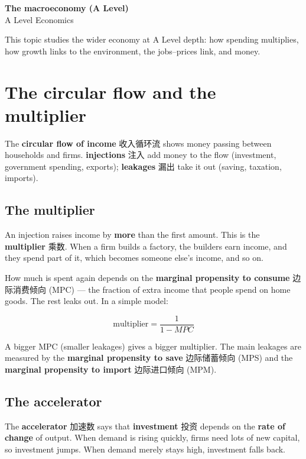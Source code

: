 \documentclass[11pt]{article}
\begin{document}
\begin{center}
  {\LARGE\bfseries The macroeconomy (A Level)}\\[0.35em]
  {\large A Level Economics}
\end{center}
\vspace{0.6em}

This topic studies the wider economy at A Level depth: how spending multiplies, how growth links to the environment, the jobs–prices link, and money.

\section*{The circular flow and the multiplier}

The \textbf{circular flow of income} 收入循环流 shows money passing between households and firms. \textbf{injections} 注入 add money to the flow (investment, government spending, exports); \textbf{leakages} 漏出 take it out (saving, taxation, imports).

\subsection*{The multiplier}

An injection raises income by \textbf{more} than the first amount. This is the \textbf{multiplier} 乘数. When a firm builds a factory, the builders earn income, and they spend part of it, which becomes someone else's income, and so on.

How much is spent again depends on the \textbf{marginal propensity to consume} 边际消费倾向 (MPC) — the fraction of extra income that people spend on home goods. The rest leaks out. In a simple model:

\[
\text{multiplier} = \frac{1}{1 - MPC}
\]

A bigger MPC (smaller leakages) gives a bigger multiplier. The main leakages are measured by the \textbf{marginal propensity to save} 边际储蓄倾向 (MPS) and the \textbf{marginal propensity to import} 边际进口倾向 (MPM).

\subsection*{The accelerator}

The \textbf{accelerator} 加速数 says that \textbf{investment} 投资 depends on the \textbf{rate of change} of output. When demand is rising quickly, firms need lots of new capital, so investment jumps. When demand merely stays high, investment falls back.
\end{document}
